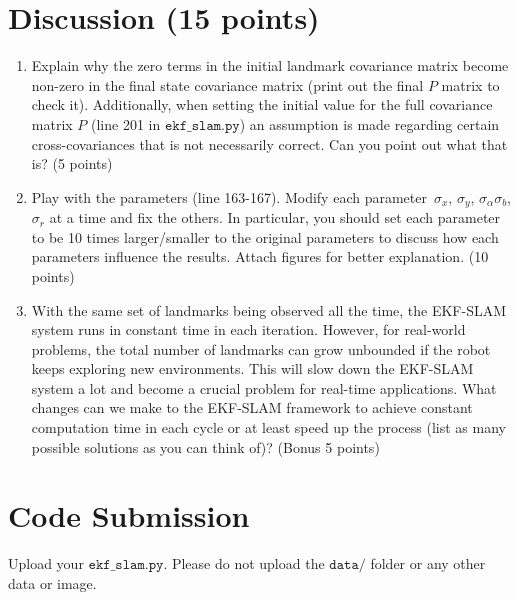 \documentclass[12pt, a4paper]{article}
\begin{document}
\section{Discussion (15 points)}

\begin{enumerate}
\item Explain why the zero terms in the initial landmark covariance
matrix become non-zero in the final state covariance matrix (print
out the final $P$ matrix to check it). Additionally, when setting
the initial value for the full covariance matrix $P$ (line 201 in
$\mathtt{ekf\_slam.py}$) an assumption is made regarding certain cross-covariances
that is not necessarily correct. Can you point out what that is? (5
points)

\item Play with the parameters (line 163-167). Modify each parameter~$\sigma_{x}$,
$\sigma_{y}$, $\sigma_{\alpha}$$\sigma_{b}$, $\sigma_{r}$ at a
time and fix the others. In particular, you should set each parameter
to be 10 times larger/smaller to the original parameters to discuss
how each parameters influence the results. Attach figures for
better explanation. (10 points)


\item With the same set of landmarks being observed all the time, the
EKF-SLAM system runs in constant time in each iteration. However,
for real-world problems, the total number of landmarks can grow unbounded
if the robot keeps exploring new environments. This will slow down
the EKF-SLAM system a lot and become a crucial problem for real-time
applications. What changes can we make to the EKF-SLAM framework to
achieve constant computation time in each cycle or at least speed
up the process (list as many possible solutions as you can think of)?
(Bonus 5 points) 
\end{enumerate}

\section{Code Submission}

Upload your $\mathtt{ekf\_slam.py}$.
Please do not upload the $\mathtt{data/}$ folder or any other data
or image.
\end{document}
